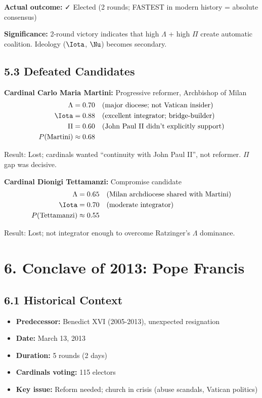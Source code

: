 \documentclass[11pt]{article}
\begin{document}
\textbf{Actual outcome:} ✓ Elected (2 rounds; FASTEST in modern history = absolute consensus)

\textbf{Significance:} 2-round victory indicates that high $\Lambda$ + high $\Pi$ create automatic coalition. Ideology ($\Iota$, $\Nu$) becomes secondary.

\subsection{5.3 Defeated Candidates}

\textbf{Cardinal Carlo Maria Martini:} Progressive reformer, Archbishop of Milan
\begin{align*}
\Lambda &= 0.70 \quad \text{(major diocese; not Vatican insider)} \\
\Iota &= 0.88 \quad \text{(excellent integrator; bridge-builder)} \\
\Pi &= 0.60 \quad \text{(John Paul II didn't explicitly support)} \\
P(\text{Martini}) &\approx 0.68
\end{align*}

Result: Lost; cardinals wanted ``continuity with John Paul II'', not reformer. $\Pi$ gap was decisive.

\textbf{Cardinal Dionigi Tettamanzi:} Compromise candidate
\begin{align*}
\Lambda &= 0.65 \quad \text{(Milan archdiocese shared with Martini)} \\
\Iota &= 0.70 \quad \text{(moderate integrator)} \\
P(\text{Tettamanzi}) &\approx 0.55
\end{align*}

Result: Lost; not integrator enough to overcome Ratzinger's $\Lambda$ dominance.

\section{6. Conclave of 2013: Pope Francis}

\subsection{6.1 Historical Context}

\begin{itemize}
\item \textbf{Predecessor:} Benedict XVI (2005-2013), unexpected resignation
\item \textbf{Date:} March 13, 2013
\item \textbf{Duration:} 5 rounds (2 days)
\item \textbf{Cardinals voting:} 115 electors
\item \textbf{Key issue:} Reform needed; church in crisis (abuse scandals, Vatican politics)
\end{itemize}
\end{document}
